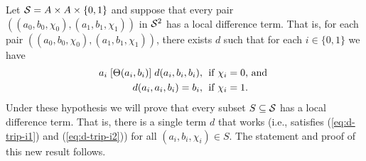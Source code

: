 Let 
$\mathcal{S} = A \times A \times \{0,1\}$ and
suppose that every pair
$((a_0, b_0, \chi_0), (a_1, b_1, \chi_1))$
in $\mathcal{S}^2$ has a local difference term.
That is, for each pair $((a_0, b_0, \chi_0), (a_1, b_1, \chi_1))$, there exists
$d$ such that for each $i \in \{0,1\}$ we have
\begin{align}
  a_i \Comr{\Cg(a_i,b_i)} d(a_i,b_i,b_i), & \;
  \text{ if $\chi_i=0$, and }  \label{eq:d-trip-i1}\\
  d(a_i,a_i,b_i) =b_i, & \;
  \text{ if $\chi_i=1$.}\label{eq:d-trip-i2} %
\end{align}
Under these hypothesis we will prove that every subset $S\subseteq \mathcal{S}$
has a local difference term.
That is, there is a single term $d$ that works (i.e., satisfies
(\ref{eq:d-trip-i1}) and (\ref{eq:d-trip-i2})) for all $(a_i, b_i, \chi_i) \in S$.
The statement and proof of this new result follows.

